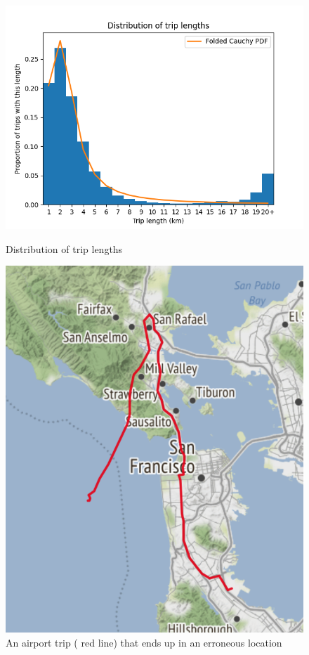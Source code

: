\documentclass[11pt]{article}
\begin{document}

\begin{figure}
	\begin{minipage}{.48\textwidth}
		\centering
		\includegraphics[width=1.2\linewidth]{./img/trip_distribution_with_dist.png}
		\caption{Distribution of trip lengths}
		\label{fig:tripLenghts}
	\end{minipage}\hfill
	\begin{minipage}{.48\textwidth}
		\centering
		\includegraphics[width=.7\linewidth]{./img/sea-trip1.png}
		\caption{An airport trip ({\color{red} red} line) that ends up in an erroneous location}
		\label{fig:seatrip}
	\end{minipage}
\end{figure}
\end{document}
